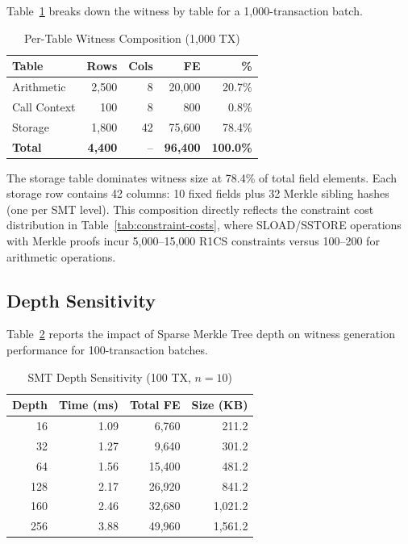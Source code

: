 \documentclass[conference]{IEEEtran}
\begin{document}
Table~\ref{tab:composition} breaks down the witness by table for a
1{,}000-transaction batch.

\begin{table}[htbp]
\caption{Per-Table Witness Composition (1{,}000 TX)}
\label{tab:composition}
\centering
\begin{tabular}{lrrrr}
\toprule
\textbf{Table} & \textbf{Rows} & \textbf{Cols} & \textbf{FE} & \textbf{\%} \\
\midrule
Arithmetic    & 2{,}500  & 8  & 20{,}000  & 20.7\% \\
Call Context  & 100    & 8  & 800     & 0.8\%  \\
Storage       & 1{,}800  & 42 & 75{,}600  & 78.4\% \\
\midrule
\textbf{Total} & \textbf{4{,}400} & -- & \textbf{96{,}400} & \textbf{100.0\%} \\
\bottomrule
\end{tabular}
\end{table}

The storage table dominates witness size at 78.4\% of total field
elements. Each storage row contains 42 columns: 10 fixed fields plus
32 Merkle sibling hashes (one per SMT level). This composition directly
reflects the constraint cost distribution in Table~\ref{tab:constraint-costs},
where SLOAD/SSTORE operations with Merkle proofs incur 5{,}000--15{,}000
R1CS constraints versus 100--200 for arithmetic operations.

\subsection{Depth Sensitivity}

Table~\ref{tab:depth} reports the impact of Sparse Merkle Tree depth
on witness generation performance for 100-transaction batches.

\begin{table}[htbp]
\caption{SMT Depth Sensitivity (100 TX, $n=10$)}
\label{tab:depth}
\centering
\begin{tabular}{rrrr}
\toprule
\textbf{Depth} & \textbf{Time (ms)} & \textbf{Total FE} & \textbf{Size (KB)} \\
\midrule
16  & 1.09 & 6{,}760   & 211.2  \\
32  & 1.27 & 9{,}640   & 301.2  \\
64  & 1.56 & 15{,}400  & 481.2  \\
128 & 2.17 & 26{,}920  & 841.2  \\
160 & 2.46 & 32{,}680  & 1{,}021.2 \\
256 & 3.88 & 49{,}960  & 1{,}561.2 \\
\bottomrule
\end{tabular}
\end{table}
\end{document}
